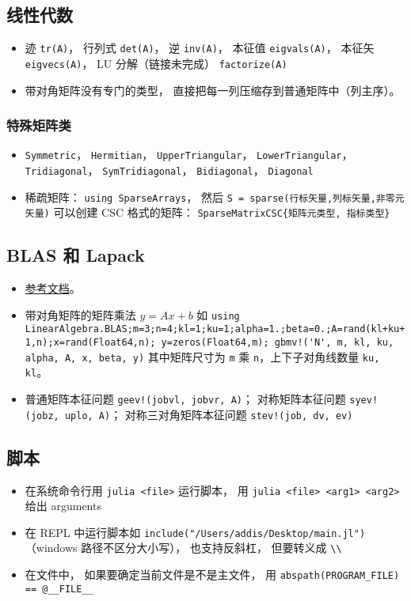 \subsection{线性代数}
\begin{itemize}
\item 迹 \verb|tr(A)|， 行列式 \verb|det(A)|， 逆 \verb|inv(A)|， 本征值 \verb|eigvals(A)|， 本征矢 \verb|eigvecs(A)|， LU 分解（链接未完成） \verb|factorize(A)|
\item 带对角矩阵没有专门的类型， 直接把每一列压缩存到普通矩阵中（列主序）。
\end{itemize}

\subsubsection{特殊矩阵类}
\begin{itemize}
\item \verb|Symmetric|， \verb|Hermitian|， \verb|UpperTriangular|， \verb|LowerTriangular|， \verb|Tridiagonal|， \verb|SymTridiagonal|， \verb|Bidiagonal|， \verb|Diagonal|
\item 稀疏矩阵： \verb|using SparseArrays|， 然后 \verb|S = sparse(行标矢量,列标矢量,非零元矢量)| 可以创建 CSC 格式的矩阵： \verb|SparseMatrixCSC{矩阵元类型, 指标类型}|
\end{itemize}

\subsection{BLAS 和 Lapack}
\begin{itemize}
\item \href{https://docs.julialang.org/en/v1/stdlib/LinearAlgebra/}{参考文档}。
\item 带对角矩阵的矩阵乘法 $y = Ax+b$ 如 \verb|using LinearAlgebra.BLAS;m=3;n=4;kl=1;ku=1;alpha=1.;beta=0.;A=rand(kl+ku+1,n);x=rand(Float64,n); y=zeros(Float64,m); gbmv!('N', m, kl, ku, alpha, A, x, beta, y)| 其中矩阵尺寸为 \verb|m| 乘 \verb|n|，上下子对角线数量 \verb|ku, kl|。
\item 普通矩阵本征问题 \verb|geev!(jobvl, jobvr, A)|； 对称矩阵本征问题 \verb|syev!(jobz, uplo, A)|； 对称三对角矩阵本征问题 \verb|stev!(job, dv, ev)|
\end{itemize}

\subsection{脚本}
\begin{itemize}
\item 在系统命令行用 \verb|julia <file>| 运行脚本， 用 \verb|julia <file> <arg1> <arg2>| 给出 arguments
\item 在 REPL 中运行脚本如 \verb|include("/Users/addis/Desktop/main.jl")|（windows 路径不区分大小写）， 也支持反斜杠， 但要转义成 \verb|\\|
\item 在文件中， 如果要确定当前文件是不是主文件， 用 \verb|abspath(PROGRAM_FILE) == @__FILE__|
\end{itemize}

